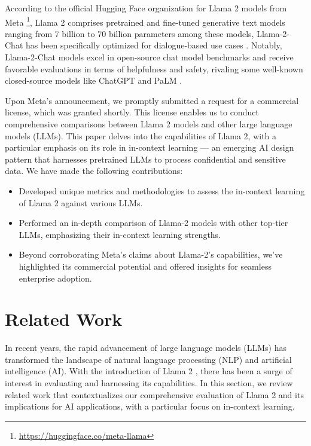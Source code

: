 \documentclass[conference]{IEEEtran}
\begin{document}
According to the official Hugging Face organization for Llama 2 models from Meta \footnote{\url{https://huggingface.co/meta-llama}}, Llama 2 comprises pretrained and fine-tuned generative text models ranging from 7 billion to 70 billion parameters among these models, Llama-2-Chat has been specifically optimized for dialogue-based use cases \cite{touvron2023llama}. Notably, Llama-2-Chat models excel in open-source chat model benchmarks and receive favorable evaluations in terms of helpfulness and safety, rivaling some well-known closed-source models like ChatGPT \cite{wang2023cost, adlakha2023evaluating} and PaLM \cite{wang2023pandalm}.


Upon Meta's announcement, we promptly submitted a request for a commercial license, which was granted shortly. This license enables us to conduct comprehensive comparisons between Llama 2 models and other large language models (LLMs).
This paper delves into the capabilities of Llama 2, with a particular emphasis on its role in in-context learning — an emerging AI design pattern that harnesses pretrained LLMs to process confidential and sensitive data. We have made the following contributions:

\begin{itemize}
    \item Developed unique metrics and methodologies to assess the in-context learning of Llama 2 against various LLMs. 
    \item Performed an in-depth comparison of Llama-2 models with other top-tier LLMs, emphasizing their in-context learning strengths.
    \item Beyond corroborating Meta’s claims about Llama-2's capabilities, we've highlighted its commercial potential and offered insights for seamless enterprise adoption. 
\end{itemize}


\section{Related Work}

In recent years, the rapid advancement of large language models (LLMs) has transformed the landscape of natural language processing (NLP) and artificial intelligence (AI). With the introduction of Llama 2 \cite{touvron2023llama}, there has been a surge of interest in evaluating and harnessing its capabilities. In this section, we review related work that contextualizes our comprehensive evaluation of Llama 2 and its implications for AI applications, with a particular focus on in-context learning.
\end{document}
